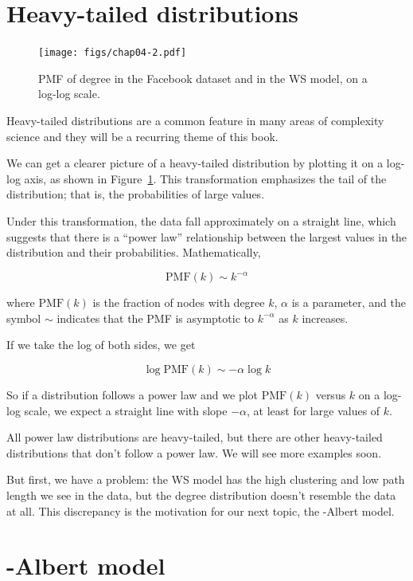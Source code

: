 \documentclass[12pt]{book}
\theoremstyle{exercise}
\begin{document}
\section{Heavy-tailed distributions}
\label{heavytail}

\begin{figure}
\centerline{\texttt{[image: figs/chap04-2.pdf]}}
\caption{PMF of degree in the Facebook dataset and in the WS model,
on a log-log scale.}
\label{chap04-2}
\end{figure}

Heavy-tailed distributions are a
common feature in many areas of complexity science and they will be a
recurring theme of this book.

We can get a clearer picture of a heavy-tailed distribution by
plotting it on a log-log axis, as shown in Figure~\ref{chap04-2}.
This transformation emphasizes the tail of the distribution; that
is, the probabilities of large values.

Under this transformation, the data fall approximately on a
straight line, which suggests that there is a ``power law''
relationship between the largest values in the distribution and their
probabilities.  Mathematically,

\newcommand{\PMF}{\mathrm{PMF}}
\newcommand{\CDF}{\mathrm{CDF}}
\newcommand{\CCDF}{\mathrm{CCDF}}

\[ \PMF(k) \sim k^{-\alpha} \]

where $\PMF(k)$ is the fraction of nodes with degree $k$, $\alpha$
is a parameter, and the symbol $\sim$ indicates that the PMF is
asymptotic to $k^{-\alpha}$ as $k$ increases.

If we take the log of both sides, we get

\[ \log \PMF(k) \sim -\alpha \log k \]

So if a distribution follows a power law and we plot $\PMF(k)$ versus
$k$ on a log-log scale, we expect a straight line with slope
$-\alpha$, at least for large values of $k$.

All power law distributions are heavy-tailed, but there are other
heavy-tailed distributions that don't follow a power law.  We will
see more examples soon.

But first, we have a problem: the WS model has the high clustering
and low path length we see in the data, but the degree distribution
doesn't resemble the data at all.  This discrepancy is the motivation
for our next topic, the \Barabasi-Albert model.


\section{\Barabasi-Albert model}
\label{scale.free}
\end{document}
